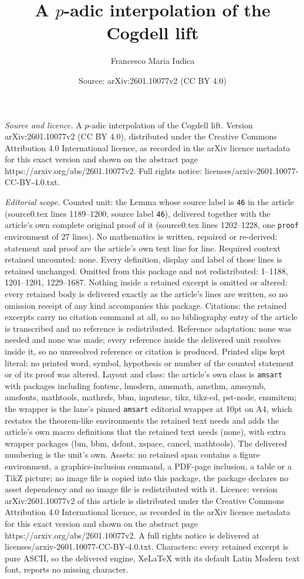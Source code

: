 \documentclass[10pt,a4paper]{amsart}
\title[A $p$-adic interpolation of the Cogdell lift]{A $p$-adic interpolation of the Cogdell lift}
\author{Francesco Maria Iudica}
\date{Source: arXiv:2601.10077v2 (CC BY 4.0)}
\begin{document}
\maketitle

\noindent\emph{Source and licence.} A $p$-adic interpolation of the Cogdell lift. Version arXiv:2601.10077v2 (CC BY 4.0), distributed under the Creative Commons Attribution 4.0 International licence, as recorded in the arXiv licence metadata for this exact version and shown on the abstract page https://arxiv.org/abs/2601.10077v2. Full rights notice: licenses/arxiv-2601.10077-CC-BY-4.0.txt.\par\smallskip

\noindent\textit{Editorial scope.} Counted unit: the Lemma whose source label is \texttt{46} in the article (source0.tex lines 1189--1200, source label \texttt{46}), delivered together with the article's own complete original proof of it (source0.tex lines 1202--1228, one \texttt{proof} environment of 27 lines). No mathematics is written, repaired or re-derived: statement and proof are the article's own text line for line. Required context retained uncounted: none. Every definition, display and label of those lines is retained unchanged. Omitted from this package and not redistributed: 1--1188, 1201--1201, 1229--1687. Nothing inside a retained excerpt is omitted or altered: every retained body is delivered exactly as the article's lines are written, so no omission receipt of any kind accompanies this package. Citations: the retained excerpts carry no citation command at all, so no bibliography entry of the article is transcribed and no reference is redistributed. Reference adaptation: none was needed and none was made; every reference inside the delivered unit resolves inside it, so no unresolved reference or citation is produced. Printed slips kept literal: no printed word, symbol, hypothesis or number of the counted statement or of its proof was altered. Layout and class: the article's own class is \texttt{amsart} with packages including fontenc, lmodern, amsmath, amsthm, amssymb, amsfonts, mathtools, mathrsfs, bbm, inputenc, tikz, tikz-cd, pst-node, enumitem; the wrapper is the lane's pinned \texttt{amsart} editorial wrapper at 10pt on A4, which restates the theorem-like environments the retained text needs and adds the article's own macro definitions that the retained text needs (none), with extra wrapper packages (bm, bbm, dsfont, xspace, cancel, mathtools). The delivered numbering is the unit's own. Assets: no retained span contains a figure environment, a graphics-inclusion command, a PDF-page inclusion, a table or a TikZ picture; no image file is copied into this package, the package declares no asset dependency and no image file is redistributed with it. Licence: version arXiv:2601.10077v2 of this article is distributed under the Creative Commons Attribution 4.0 International licence, as recorded in the arXiv licence metadata for this exact version and shown on the abstract page https://arxiv.org/abs/2601.10077v2. A full rights notice is delivered at licenses/arxiv-2601.10077-CC-BY-4.0.txt. Characters: every retained excerpt is pure ASCII, so the delivered engine, XeLaTeX with its default Latin Modern text font, reports no missing character.
\end{document}
